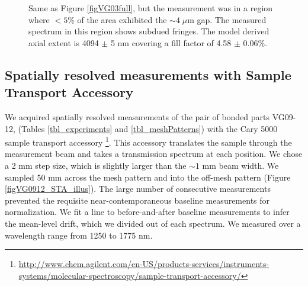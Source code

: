 \begin{figure}[htbp]
    \centering
    	\newline
	\caption[MCMC corner plot and fitted spectrum for gap size parameters when the gap fills only a small fraction of the measurement beam]{ Same as Figure \ref{figVG03full}, but the measurement was in a region where $<5\%$ of the area exhibited the $\sim4\; \mu$m gap.  The measured spectrum in this region shows subdued fringes. The model derived axial extent is 4094 $\pm$ 5 nm covering a fill factor of 4.58 $\pm$ 0.06$\%$. }
	\label{figVG03part}
\end{figure}


\subsection{Spatially resolved measurements with Sample Transport Accessory}
We acquired spatially resolved measurements of the pair of bonded parts VG09-12, (Tables \ref{tbl_experiments} and \ref{tbl_meshPatterns}) with the Cary 5000 sample transport accessory \footnote{\url{http://www.chem.agilent.com/en-US/products-services/instruments-systems/molecular-spectroscopy/sample-transport-accessory/}}.  This accessory translates the sample through the measurement beam and takes a transmission spectrum at each position.  We chose a 2 mm step size, which is slightly larger than the $\sim1$ mm beam width.  We sampled 50 mm across the mesh pattern and into the off-mesh pattern (Figure \ref{figVG0912_STA_illus}).  The large number of consecutive measurements prevented the requisite near-contemporaneous baseline measurements for normalization.  We fit a line to before-and-after baseline measurements to infer the mean-level drift, which we divided out of each spectrum.  We measured over a wavelength range from 1250 to 1775 nm.


